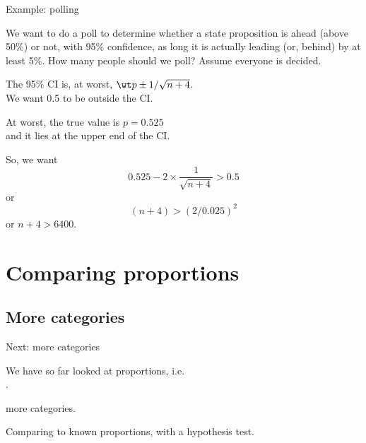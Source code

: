 \begin{frame}{Example: polling}

    We want to do a poll to determine whether a state proposition 
    is ahead (above 50\%) or not,
    with 95\% confidence,
    as long it is actually leading (or, behind) by at least 5\%.
    How many people should we poll?
    Assume everyone is decided.
    \pause

    \vspace{2em}

    The 95\% CI is, at worst, $\wt p \pm 1/\sqrt{n+4}$.  \\
    \hspace{3em} We want 0.5 to be \alert{outside} the CI.
    \pause

    \vspace{2em}

    At worst, the true value is $p=0.525$ \\
    \hspace{3em} and it lies at the upper end of the CI.
    \pause

    \vspace{2em}

    So, we want
    \[
    0.525 - 2 \times \frac{1}{\sqrt{n+4}} > 0.5
    \]
    or
    \[
    (n+4) > (2/0.025)^2
    \]
    or $n+4 > 6400$.

\end{frame}

\section{Comparing proportions}

\subsection{More categories}

\begin{frame}{Next: more categories}

  We have so far looked at proportions, i.e.\\
  .

  \vspace{2em}

   more categories.
  
  \vspace{2em}

  Comparing to known proportions, with a hypothesis test.

\end{frame}

